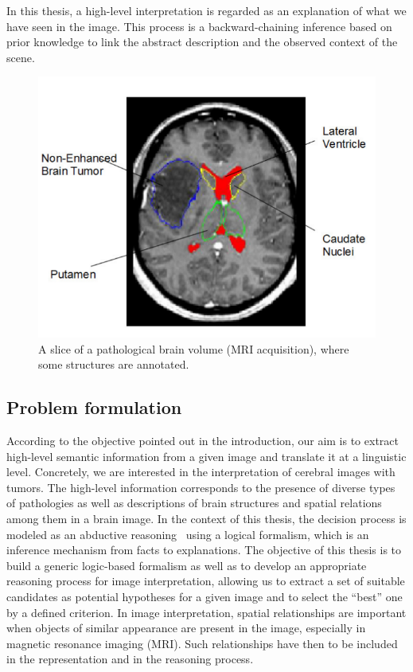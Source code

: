 \documentclass{article}
\begin{document}
 In this thesis, a high-level interpretation is regarded as an explanation of what we have seen in the image.
 This process is a backward-chaining inference based on  prior knowledge to link the abstract description and the observed context of the scene.
  \begin{figure}[h]
  \centering
   \includegraphics[scale=.2]{./figures/patho_brain.png}
   \caption{\label{fig:patho_brain} A slice of a pathological brain volume (MRI acquisition), where some structures are annotated.}
 \end{figure} 
\subsection{Problem formulation}
According to the objective pointed out in the introduction, our aim is to extract high-level semantic information from a given image and translate it at a linguistic level.
Concretely, we are interested in the interpretation of cerebral images with tumors. The high-level information corresponds to the presence of diverse types of pathologies
 as well as descriptions of brain structures and spatial relations among them in a brain image. 
 In the context of this thesis, the decision process is modeled as an abductive reasoning~\cite{aliseda1997seeking} using a logical formalism, 
 which is an inference mechanism from facts to explanations.
The objective of this thesis is to build a generic logic-based formalism as well as  to develop an appropriate reasoning process for image interpretation, 
 allowing us to extract a set of suitable candidates as potential hypotheses for a given image and to select the ``best'' one by a defined criterion.  
 In image interpretation, spatial relationships are important when objects of similar appearance are present in the image, especially in magnetic resonance imaging (MRI).
 Such relationships have then to be included in the representation and in the reasoning process.
  
\end{document}
